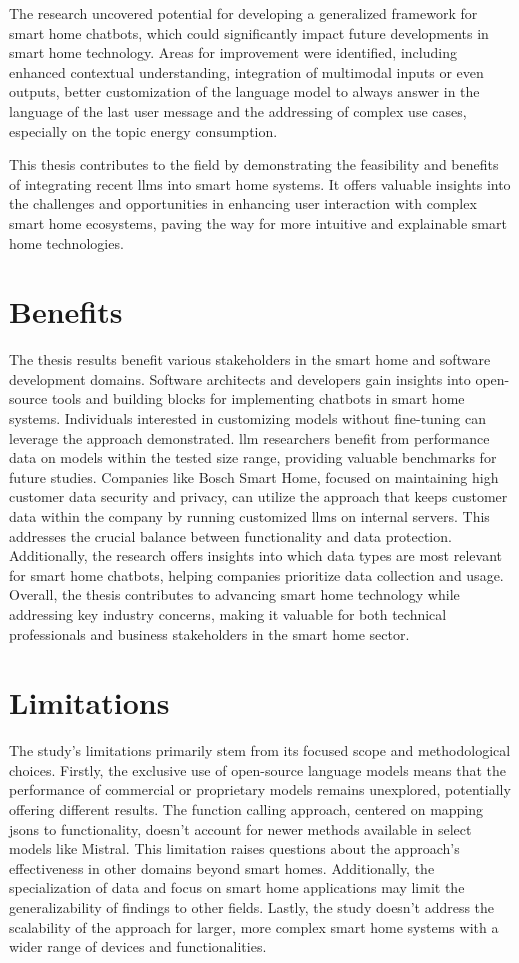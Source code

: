 The research uncovered potential for developing a generalized framework for smart home chatbots, which could significantly impact future developments in smart home technology. Areas for improvement were identified, including enhanced contextual understanding, integration of multimodal inputs or even outputs, better customization of the language model to always answer in the language of the last user message and the addressing of complex use cases, especially on the topic energy consumption.

This thesis contributes to the field by demonstrating the feasibility and benefits of integrating recent \glspl{llm} into smart home systems. It offers valuable insights into the challenges and opportunities in enhancing user interaction with complex smart home ecosystems, paving the way for more intuitive and explainable smart home technologies.

\section{Benefits}
The thesis results benefit various stakeholders in the smart home and software development domains. Software architects and developers gain insights into open-source tools and building blocks for implementing chatbots in smart home systems. Individuals interested in customizing models without fine-tuning can leverage the approach demonstrated. 
\gls{llm} researchers benefit from performance data on models within the tested size range, providing valuable benchmarks for future studies. 
Companies like Bosch Smart Home, focused on maintaining high customer data security and privacy, can utilize the approach that keeps customer data within the company by running customized \glspl{llm} on internal servers. 
This addresses the crucial balance between functionality and data protection. Additionally, the research offers insights into which data types are most relevant for smart home chatbots, helping companies prioritize data collection and usage. 
Overall, the thesis contributes to advancing smart home technology while addressing key industry concerns, making it valuable for both technical professionals and business stakeholders in the smart home sector.

\section{Limitations}
The study's limitations primarily stem from its focused scope and methodological choices. 
Firstly, the exclusive use of open-source language models means that the performance of commercial or proprietary models remains unexplored, potentially offering different results. 
The function calling approach, centered on mapping \glspl{json} to functionality, doesn't account for newer methods available in select models like Mistral. This limitation raises questions about the approach's effectiveness in other domains beyond smart homes. 
Additionally, the specialization of data and focus on smart home applications may limit the generalizability of findings to other fields. 
Lastly, the study doesn't address the scalability of the approach for larger, more complex smart home systems with a wider range of devices and functionalities.

